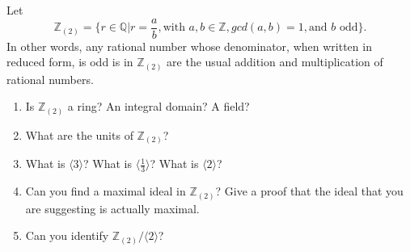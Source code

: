 \documentclass[12pt,letterpaper,boxed]{hmcpset}
\begin{document}
\begin{solution}
\end{solution}

\clearpage

\begin{problem}[16.2.11]
Let $$ \mathbb{Z}_{(2)} = \{r \in \mathbb{Q} \vert r = \frac{a}{b}, \text{with } a,b \in \mathbb{Z}, gcd(a,b) = 1, \text{and } b \text{ odd} \}.$$
In other words, any rational number whose denominator, when written in reduced form, is odd is in $\mathbb{Z}_{(2)}$ are the usual addition and multiplication of rational numbers. 
\begin{enumerate}[label=\alph*]
\item Is $\mathbb{Z}_{(2)}$ a ring? An integral domain? A field?
\item What are the units of $\mathbb{Z}_{(2)}$?
\item What is $\langle 3 \rangle$? What is $\langle \frac{1}{3} \rangle$? What is $\langle 2 \rangle$?
\item Can you find a maximal ideal in $\mathbb{Z}_{(2)}$? Give a proof that the ideal that you are suggesting is actually maximal.
\item Can you identify $\mathbb{Z}_{(2)}/\langle 2 \rangle$?
\end{enumerate}
\end{problem}

\begin{solution}

\end{solution}
\end{document}
